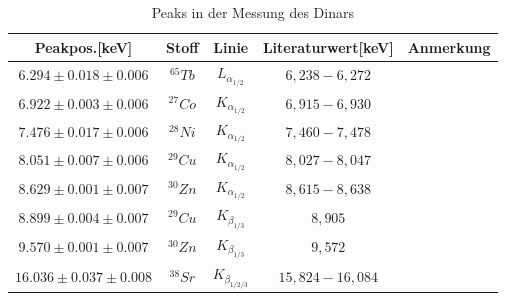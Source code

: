 \documentclass[12pt,a4paper]{article}
\begin{document}
\begin{table}[H]
\center
\begin{tabular}{|c|c|c|c|c|}
\hline 
Peakpos.[keV] & Stoff & Linie & Literaturwert[keV] & Anmerkung \\
\hline 
$6.294 \pm 0.018 \pm 0.006$& $^{65}Tb$ & $L_{\alpha_{1/2}}$ & $6,238-6,272$ & \\
\hline 
$6.922 \pm 0.003 \pm 0.006$ & $^{27}Co$ & $K_{\alpha_{1/2}}$ & $6,915-6,930$ & \\ 
\hline 
$7.476 \pm 0.017 \pm 0.006$ & $^{28}Ni$ & $K_{\alpha_{1/2}}$ & $7,460-7,478$ & \\
\hline
$8.051 \pm 0.007 \pm 0.006$ & $^{29}Cu$ & $K_{\alpha_{1/2}}$ & $8,027-8,047$ & \\
\hline
$8.629 \pm 0.001 \pm 0.007$ & $^{30}Zn$ & $K_{\alpha_{1/2}}$ & $8,615-8,638$ & \\
\hline
$8.899 \pm 0.004 \pm 0.007$ & $^{29}Cu$ & $K_{\beta_{1/3}}$ & $8,905$ & \\
\hline
$9.570 \pm 0.001 \pm 0.007$ & $^{30}Zn$ & $K_{\beta_{1/3}}$ & $9,572$ & \\
\hline
$16.036 \pm 0.037 \pm 0.008$ & $^{38}Sr$ & $K_{\beta_{1/2/3}}$ & $15,824-16,084$ & \\
\hline
\end{tabular} 
\caption{Peaks in der Messung des Dinars}
\label{prop_dinar}
\end{table}

\newpage
\end{document}

